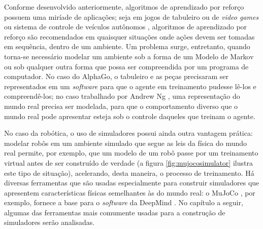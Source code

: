 \documentclass[cic,tc]{iiufrgs}
\begin{document}
Conforme desenvolvido anteriormente, algoritmos de aprendizado por reforço
possuem uma miríade de aplicações; seja em jogos de tabuleiro ou de
\textit{video games} ou sistema de controle de veículos autônomos \cite{Ng2003},
algoritmos de aprendizado por reforço são recomendados em quaisquer situações
onde ações devem ser tomadas em sequência, dentro de um ambiente. Um problema
surge, entretanto, quando torna-se necessário modelar um ambiente sob a forma de
um Modelo de Markov ou sob qualquer outra forma que possa ser compreendida por
um programa de computador. No caso do AlphaGo, o tabuleiro e as peças precisaram
ser representados em um \textit{software} para que o agente em treinamento
pudesse lê-los e compreendê-los; no caso trabalhado por Andrew Ng \cite{Ng2003}, uma representação
do mundo real precisa ser modelada, para que o comportamento diverso que o mundo
real pode apresentar esteja sob o controle daqueles que treinam o agente.


No caso da robótica, o uso de simuladores possui ainda outra vantagem prática:
modelar robôs em um ambiente simulado que segue as leis da física do mundo real
permite, por exemplo, que um modelo de um robô passe por um treinamento virtual
antes de ser construído de verdade (a figura \ref{fig:mujocosimulator} ilustra
este tipo de situação), acelerando, desta maneira, o processo de treinamento. Há
diversas ferramentas que são usadas especialmente para construir simuladores que
apresentem características físicas semelhantes às do mundo real: o MuJoCo \cite{Mujoco},
por exemplo, fornece a base para o \textit{software} da DeepMind \cite{DMControl}. No
capítulo a seguir, algumas das ferramentas mais comumente usadas para a
construção de simuladores serão analisadas.
%
\end{document}
